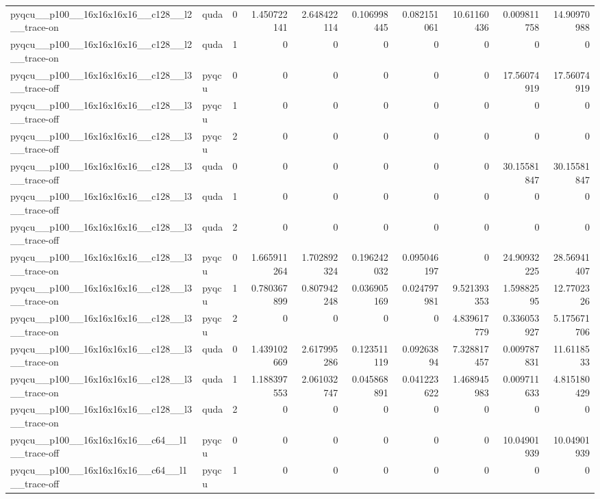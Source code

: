 \begin{table}[htbp]
\begin{tabular}{@{}llrrrrrrrr@{}}
pyqcu\_\_p100\_\_16x16x16x16\_\_c128\_\_l2\_\_trace-on & quda & 0 & 1.450722141 & 2.648422114 & 0.106998445 & 0.082151061 & 10.61160436 & 0.009811758 & 14.90970988 \\
pyqcu\_\_p100\_\_16x16x16x16\_\_c128\_\_l2\_\_trace-on & quda & 1 & 0 & 0 & 0 & 0 & 0 & 0 & 0 \\
pyqcu\_\_p100\_\_16x16x16x16\_\_c128\_\_l3\_\_trace-off & pyqcu & 0 & 0 & 0 & 0 & 0 & 0 & 17.56074919 & 17.56074919 \\
pyqcu\_\_p100\_\_16x16x16x16\_\_c128\_\_l3\_\_trace-off & pyqcu & 1 & 0 & 0 & 0 & 0 & 0 & 0 & 0 \\
pyqcu\_\_p100\_\_16x16x16x16\_\_c128\_\_l3\_\_trace-off & pyqcu & 2 & 0 & 0 & 0 & 0 & 0 & 0 & 0 \\
pyqcu\_\_p100\_\_16x16x16x16\_\_c128\_\_l3\_\_trace-off & quda & 0 & 0 & 0 & 0 & 0 & 0 & 30.15581847 & 30.15581847 \\
pyqcu\_\_p100\_\_16x16x16x16\_\_c128\_\_l3\_\_trace-off & quda & 1 & 0 & 0 & 0 & 0 & 0 & 0 & 0 \\
pyqcu\_\_p100\_\_16x16x16x16\_\_c128\_\_l3\_\_trace-off & quda & 2 & 0 & 0 & 0 & 0 & 0 & 0 & 0 \\
pyqcu\_\_p100\_\_16x16x16x16\_\_c128\_\_l3\_\_trace-on & pyqcu & 0 & 1.665911264 & 1.702892324 & 0.196242032 & 0.095046197 & 0 & 24.90932225 & 28.56941407 \\
pyqcu\_\_p100\_\_16x16x16x16\_\_c128\_\_l3\_\_trace-on & pyqcu & 1 & 0.780367899 & 0.807942248 & 0.036905169 & 0.024797981 & 9.521393353 & 1.59882595 & 12.7702326 \\
pyqcu\_\_p100\_\_16x16x16x16\_\_c128\_\_l3\_\_trace-on & pyqcu & 2 & 0 & 0 & 0 & 0 & 4.839617779 & 0.336053927 & 5.175671706 \\
pyqcu\_\_p100\_\_16x16x16x16\_\_c128\_\_l3\_\_trace-on & quda & 0 & 1.439102669 & 2.617995286 & 0.123511119 & 0.09263894 & 7.328817457 & 0.009787831 & 11.6118533 \\
pyqcu\_\_p100\_\_16x16x16x16\_\_c128\_\_l3\_\_trace-on & quda & 1 & 1.188397553 & 2.061032747 & 0.045868891 & 0.041223622 & 1.468945983 & 0.009711633 & 4.815180429 \\
pyqcu\_\_p100\_\_16x16x16x16\_\_c128\_\_l3\_\_trace-on & quda & 2 & 0 & 0 & 0 & 0 & 0 & 0 & 0 \\
pyqcu\_\_p100\_\_16x16x16x16\_\_c64\_\_l1\_\_trace-off & pyqcu & 0 & 0 & 0 & 0 & 0 & 0 & 10.04901939 & 10.04901939 \\
pyqcu\_\_p100\_\_16x16x16x16\_\_c64\_\_l1\_\_trace-off & pyqcu & 1 & 0 & 0 & 0 & 0 & 0 & 0 & 0 \\

\end{tabular}
\end{table}
